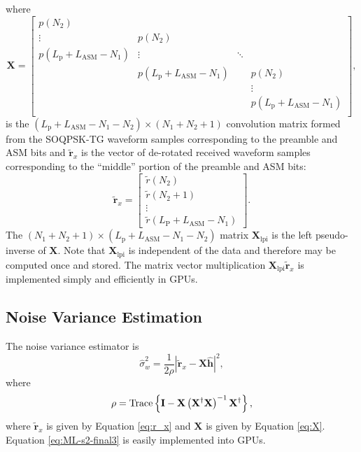 where 
\begin{equation}
\mathbf{X} = 
		\begin{bmatrix}
		p(N_2)							& 								& 		&  			\\
		\vdots 							& p(N_2)						& 		&  			\\
		p(L_\text{p}+L_\text{ASM}-N_1)	&\vdots							& \ddots&  			\\
										& p(L_\text{p}+L_\text{ASM}-N_1)&  		& p(N_2)  	\\
		 								&  								&  		& \vdots 	\\
		 								&  	   							&  		& p(L_\text{p}+L_\text{ASM}-N_1)\\
	\end{bmatrix},
	\label{eq:X}
\end{equation}
is the $(L_\text{p}+L_\text{ASM}-N_1-N_2)\times(N_1+N_2+1)$ convolution matrix formed from 
the SOQPSK-TG waveform samples corresponding to the preamble and ASM bits and $\tilde{\mathbf{r}}_x$ is the vector of de-rotated received waveform samples corresponding to the ``middle'' portion of the preamble and ASM bits:
\begin{equation}
\tilde{\mathbf{r}}_x = 
\begin{bmatrix}
\tilde{r}(N_2) \\
\tilde{r}(N_2+1) \\
\vdots \\
\tilde{r}(L_\text{P} + L_\text{ASM}-N_1)
\end{bmatrix}.
\label{eq:r_x}
\end{equation}
The $(N_1+N_2+1)\times(L_\text{p}+L_\text{ASM}-N_1-N_2)$ matrix $\mathbf{X}_\text{lpi}$ is the left pseudo-inverse of $\mathbf{X}$.
Note that $\mathbf{X}_\text{lpi}$ is independent of the data and therefore may be computed once and stored.
The matrix vector multiplication $\mathbf{X}_\text{lpi} \tilde{\mathbf{r}}_x$ is implemented simply and efficiently in GPUs.


\subsection{Noise Variance Estimation}
\label{sec:noise_variance_estimation}
The noise variance estimator is \cite[eq. 9]{rice-afran-saquib-cole-rhodes-moazzami:2014}
\begin{equation}
	\hat{\sigma}_w^2 = \frac{1}{2\rho} \left| \tilde{\mathbf{r}}_x-\mathbf{X}\hat{\mathbf{h}}\right|^2,
	\label{eq:ML-s2-final3}
\end{equation}
where
\begin{equation}
	\rho = {\rm Trace} \left\{ \mathbf{I} -  \mathbf{X}\left(\mathbf{X}^\dag\mathbf{X}\right)^{-1}\mathbf{X}^\dag \right\},
\end{equation}
where $\tilde{\mathbf{r}}_x$ is given by Equation \eqref{eq:r_x} and $\mathbf{X}$ is given by Equation \eqref{eq:X}.
Equation \eqref{eq:ML-s2-final3} is easily implemented into GPUs.


